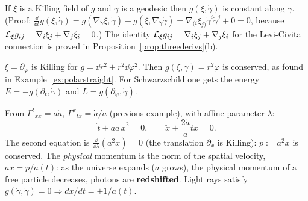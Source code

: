 \begin{formal}
If $\xi$ is a Killing field of $g$ and $\gamma$ is a geodesic then $g(\xi,\dot\gamma)$ is constant along $\gamma$. (Proof: $\frac{\dd}{\dd t}g(\xi,\dot\gamma)=g(\nabla_{\dot\gamma}\xi,\dot\gamma)+g(\xi,\nabla_{\dot\gamma}\dot\gamma)=\nabla_{(i}\xi_{j)}\dot\gamma^i\dot\gamma^j+0=0$, because $\mathcal{L}_\xi g_{ij}=\nabla_i\xi_j+\nabla_j\xi_i=0$.)
The identity $\mathcal{L}_\xi g_{ij}=\nabla_i\xi_j+\nabla_j\xi_i$ for the Levi-Civita connection is proved in Proposition~\ref{prop:threederivs}(b).
\end{formal}
\begin{example}\label{ex:angmom}
$\xi=\partial_\varphi$ is Killing for $g=\dd r^2+r^2\dd\varphi^2$. Then $g(\xi,\dot\gamma)=r^2\dot\varphi$ is conserved, as found in Example~\ref{ex:polarstraight}. For Schwarzschild one gets the energy $E=-g(\partial_t,\dot\gamma)$ and $L=g(\partial_\varphi,\dot\gamma)$.
\end{example}

\begin{example}
From $\Gamma^t{}_{xx}=a\dot a$, $\Gamma^x{}_{tx}=\dot a/a$ (previous example), with affine parameter $\lambda$:
\[
\ddot t+a\dot a\,\dot x^2=0,\qquad\ddot x+\frac{2\dot a}{a}\dot t\dot x=0 .
\]
The second equation is $\frac{\dd}{\dd\lambda}(a^2\dot x)=0$ (the translation $\partial_x$ is Killing): $p:=a^2\dot x$ is conserved. The \emph{physical} momentum is the norm of the spatial velocity, $a\dot x=p/a(t)$: as the universe expands ($a$ grows), the physical momentum of a free particle decreases, \ie photons are \textbf{redshifted}. Light rays satisfy $g(\dot\gamma,\dot\gamma)=0\Rightarrow dx/dt=\pm1/a(t)$.
\end{example}
